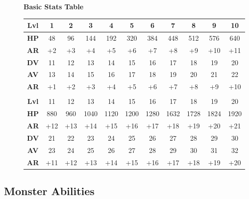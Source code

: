 \begin{figure}[h]
\center
\textbf{Basic Stats Table}\\
\begin{tabular}{|c||c|c|c|c|c|c|c|c|c|c|}
\hline 
\textbf{Lvl} & 1 & 2 & 3 & 4 & 5 & 6 & 7 & 8 & 9 & 10 \\
\hline
\textbf{HP} & 48 & 96 & 144 & 192 & 320 & 384 & 448 & 512 & 576 & 640 \\
\hline
\textbf{AR} & +2 & +3 & +4 & +5 & +6 & +7 & +8 & +9 & +10 & +11 \\
\hline
\textbf{DV} & 11 & 12 & 13 & 14 & 15 & 16 & 17 & 18 & 19 & 20 \\
\hline
\textbf{AV} & 13 & 14 & 15 & 16 & 17 & 18 & 19 & 20 & 21 & 22 \\
\hline
\textbf{AR} & +1 & +2 & +3 & +4 & +5 & +6 & +7 & +8 & +9 & +10\\
\hline
\multicolumn{11}{c}{ } \\
\hline 
\textbf{Lvl} & 11 & 12 & 13 & 14 & 15 & 16 & 17 & 18 & 19 & 20 \\
\hline
\textbf{HP} & 880 & 960 & 1040 & 1120 & 1200 & 1280 & 1632 & 1728 & 1824 & 1920 \\
\hline
\textbf{AR} & +12 & +13 & +14 & +15 & +16 & +17 & +18 & +19 & +20 & +21 \\
\hline
\textbf{DV} & 21 & 22 & 23 & 24 & 25 & 26 & 27 & 28 & 29 & 30 \\
\hline
\textbf{AV} & 23 & 24 & 25 & 26 & 27 & 28 & 29 & 30 & 31 & 32 \\
\hline
\textbf{AR} & +11 & +12 & +13 & +14 & +15 & +16 & +17 & +18 & +19 & +20\\
\hline
\end{tabular}
\end{figure}

\subsection*{Monster Abilities}
